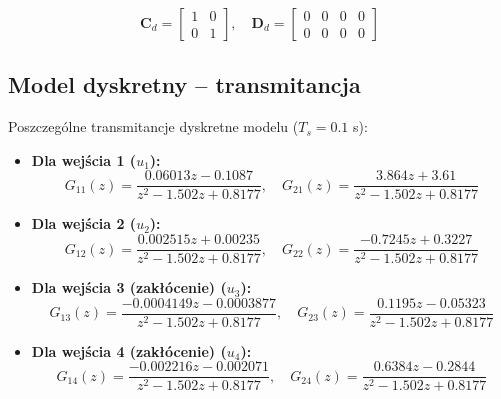 \documentclass[a4paper,12pt]{article}
\begin{document}
\begin{equation}
\mathbf{C}_d = \begin{bmatrix} 
1 & 0 \\ 
0 & 1 
\end{bmatrix}, \quad 
\mathbf{D}_d = \begin{bmatrix} 
0 & 0 & 0 & 0 \\ 
0 & 0 & 0 & 0 
\end{bmatrix}
\end{equation}

\subsection{Model dyskretny – transmitancja}
\noindent Poszczególne transmitancje dyskretne modelu ($T_s = 0.1$ s):

\begin{itemize}
    \item \textbf{Dla wejścia 1 ($u_1$):}
    \begin{equation}
    G_{11}(z) = \frac{0.06013 z - 0.1087}{z^2 - 1.502 z + 0.8177}, \quad G_{21}(z) = \frac{3.864 z + 3.61}{z^2 - 1.502 z + 0.8177}
    \end{equation}

    \item \textbf{Dla wejścia 2 ($u_2$):}
    \begin{equation}
    G_{12}(z) = \frac{0.002515 z + 0.00235}{z^2 - 1.502 z + 0.8177}, \quad G_{22}(z) = \frac{-0.7245 z + 0.3227}{z^2 - 1.502 z + 0.8177}
    \end{equation}

    \item \textbf{Dla wejścia 3 (zakłócenie) ($u_3$):}
    \begin{equation}
    G_{13}(z) = \frac{-0.0004149 z - 0.0003877}{z^2 - 1.502 z + 0.8177}, \quad G_{23}(z) = \frac{0.1195 z - 0.05323}{z^2 - 1.502 z + 0.8177}
    \end{equation}

    \item \textbf{Dla wejścia 4 (zakłócenie) ($u_4$):}
    \begin{equation}
    G_{14}(z) = \frac{-0.002216 z - 0.002071}{z^2 - 1.502 z + 0.8177}, \quad G_{24}(z) = \frac{0.6384 z - 0.2844}{z^2 - 1.502 z + 0.8177}
    \end{equation}
\end{itemize}
\end{document}
